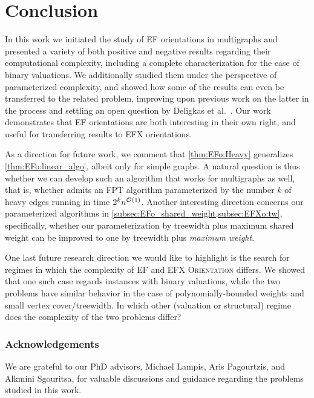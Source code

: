 \section{Conclusion}\label{sec:conclusion}

In this work we initiated the study of EF orientations in multigraphs and presented a variety of both positive and negative results regarding
their computational complexity, including a complete characterization for the case of binary valuations. We additionally studied them under the perspective of parameterized complexity,
and showed how some of the results can even be transferred to the related {\EFXo} problem, improving upon previous work on the latter in the process and settling an open question by Deligkas et al.~\cite{ijcai/DeligkasEGK25}. Our work demonstrates that EF orientations are both interesting in their own right, and useful for transferring results to EFX orientations.

As a direction for future work, we comment that \cref{thm:EFo:Heavy} generalizes \cref{thm:EFo:linear_algo}, albeit only for simple graphs.
A natural question is thus whether we can develop such an algorithm that works for multigraphs as well, that is, whether {\EFo}
admits an FPT algorithm parameterized by the number $k$ of heavy edges running in time $2^k n^{\mathcal{O}(1)}$.
Another interesting direction concerns our parameterized algorithms in \cref{subsec:EFo_shared_weight,subsec:EFXo:tw}, specifically, whether our parameterization by treewidth plus maximum shared weight can be improved to one by treewidth plus \emph{maximum weight}.

One last future research direction we would like to highlight is the search for regimes in which the complexity of EF and EFX \textsc{Orientation} differs.
We showed that one such case regards instances with binary valuations, while the two problems have similar behavior in the case of
polynomially-bounded weights and small vertex cover/treewidth.
In which other (valuation or structural) regime does the complexity of the two problems differ?



\subsubsection*{Acknowledgements}

We are grateful to our PhD advisors, Michael Lampis, Aris Pagourtzis, and Alkmini Sgouritsa, for valuable discussions and guidance regarding the problems studied in this work.


